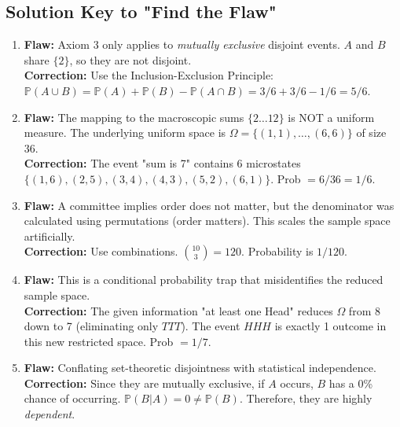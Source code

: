 \documentclass[11pt, letterpaper]{article}
\theoremstyle{definition}
\theoremstyle{remark}
\newcommand{\Prob}{\mathbb{P}}
\begin{document}
\subsection*{Solution Key to "Find the Flaw"}
\begin{enumerate}
    \item \textbf{Flaw:} Axiom 3 only applies to \textit{mutually exclusive} disjoint events. $A$ and $B$ share $\{2\}$, so they are not disjoint. \\ \textbf{Correction:} Use the Inclusion-Exclusion Principle: $\Prob(A \cup B) = \Prob(A) + \Prob(B) - \Prob(A \cap B) = 3/6 + 3/6 - 1/6 = 5/6$.
    \item \textbf{Flaw:} The mapping to the macroscopic sums $\{2 \dots 12\}$ is NOT a uniform measure. The underlying uniform space is $\Omega = \{(1,1), \dots, (6,6)\}$ of size 36. \\ \textbf{Correction:} The event "sum is 7" contains 6 microstates $\{(1,6), (2,5), (3,4), (4,3), (5,2), (6,1)\}$. Prob $= 6/36 = 1/6$.
    \item \textbf{Flaw:} A committee implies order does not matter, but the denominator was calculated using permutations (order matters). This scales the sample space artificially. \\ \textbf{Correction:} Use combinations. $\binom{10}{3} = 120$. Probability is $1/120$. 
    \item \textbf{Flaw:} This is a conditional probability trap that misidentifies the reduced sample space. \\ \textbf{Correction:} The given information "at least one Head" reduces $\Omega$ from 8 down to 7 (eliminating only $TTT$). The event $HHH$ is exactly 1 outcome in this new restricted space. Prob $= 1/7$.
    \item \textbf{Flaw:} Conflating set-theoretic disjointness with statistical independence. \\ \textbf{Correction:} Since they are mutually exclusive, if $A$ occurs, $B$ has a 0\% chance of occurring. $\Prob(B|A) = 0 \neq \Prob(B)$. Therefore, they are highly \textit{dependent}.
\end{enumerate}
\end{document}
